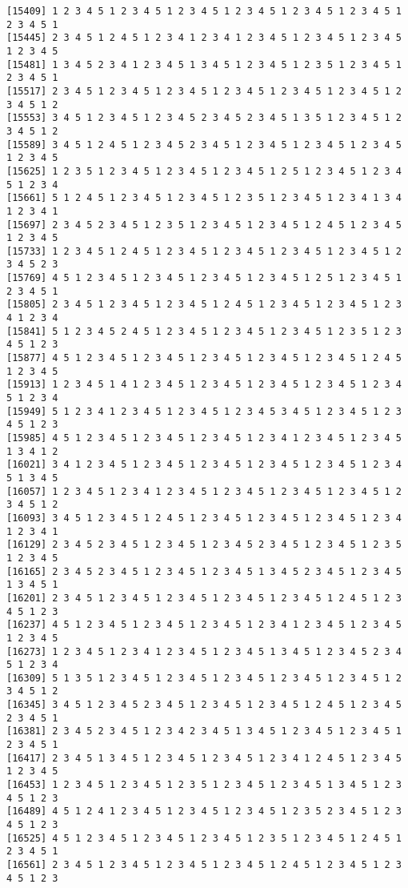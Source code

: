 \documentclass[
  11pt,
]{book}
\begin{document}
\begin{verbatim}
[15409] 1 2 3 4 5 1 2 3 4 5 1 2 3 4 5 1 2 3 4 5 1 2 3 4 5 1 2 3 4 5 1 2 3 4 5 1
[15445] 2 3 4 5 1 2 4 5 1 2 3 4 1 2 3 4 1 2 3 4 5 1 2 3 4 5 1 2 3 4 5 1 2 3 4 5
[15481] 1 3 4 5 2 3 4 1 2 3 4 5 1 3 4 5 1 2 3 4 5 1 2 3 5 1 2 3 4 5 1 2 3 4 5 1
[15517] 2 3 4 5 1 2 3 4 5 1 2 3 4 5 1 2 3 4 5 1 2 3 4 5 1 2 3 4 5 1 2 3 4 5 1 2
[15553] 3 4 5 1 2 3 4 5 1 2 3 4 5 2 3 4 5 2 3 4 5 1 3 5 1 2 3 4 5 1 2 3 4 5 1 2
[15589] 3 4 5 1 2 4 5 1 2 3 4 5 2 3 4 5 1 2 3 4 5 1 2 3 4 5 1 2 3 4 5 1 2 3 4 5
[15625] 1 2 3 5 1 2 3 4 5 1 2 3 4 5 1 2 3 4 5 1 2 5 1 2 3 4 5 1 2 3 4 5 1 2 3 4
[15661] 5 1 2 4 5 1 2 3 4 5 1 2 3 4 5 1 2 3 5 1 2 3 4 5 1 2 3 4 1 3 4 1 2 3 4 1
[15697] 2 3 4 5 2 3 4 5 1 2 3 5 1 2 3 4 5 1 2 3 4 5 1 2 4 5 1 2 3 4 5 1 2 3 4 5
[15733] 1 2 3 4 5 1 2 4 5 1 2 3 4 5 1 2 3 4 5 1 2 3 4 5 1 2 3 4 5 1 2 3 4 5 2 3
[15769] 4 5 1 2 3 4 5 1 2 3 4 5 1 2 3 4 5 1 2 3 4 5 1 2 5 1 2 3 4 5 1 2 3 4 5 1
[15805] 2 3 4 5 1 2 3 4 5 1 2 3 4 5 1 2 4 5 1 2 3 4 5 1 2 3 4 5 1 2 3 4 1 2 3 4
[15841] 5 1 2 3 4 5 2 4 5 1 2 3 4 5 1 2 3 4 5 1 2 3 4 5 1 2 3 5 1 2 3 4 5 1 2 3
[15877] 4 5 1 2 3 4 5 1 2 3 4 5 1 2 3 4 5 1 2 3 4 5 1 2 3 4 5 1 2 4 5 1 2 3 4 5
[15913] 1 2 3 4 5 1 4 1 2 3 4 5 1 2 3 4 5 1 2 3 4 5 1 2 3 4 5 1 2 3 4 5 1 2 3 4
[15949] 5 1 2 3 4 1 2 3 4 5 1 2 3 4 5 1 2 3 4 5 3 4 5 1 2 3 4 5 1 2 3 4 5 1 2 3
[15985] 4 5 1 2 3 4 5 1 2 3 4 5 1 2 3 4 5 1 2 3 4 1 2 3 4 5 1 2 3 4 5 1 3 4 1 2
[16021] 3 4 1 2 3 4 5 1 2 3 4 5 1 2 3 4 5 1 2 3 4 5 1 2 3 4 5 1 2 3 4 5 1 3 4 5
[16057] 1 2 3 4 5 1 2 3 4 1 2 3 4 5 1 2 3 4 5 1 2 3 4 5 1 2 3 4 5 1 2 3 4 5 1 2
[16093] 3 4 5 1 2 3 4 5 1 2 4 5 1 2 3 4 5 1 2 3 4 5 1 2 3 4 5 1 2 3 4 1 2 3 4 1
[16129] 2 3 4 5 2 3 4 5 1 2 3 4 5 1 2 3 4 5 2 3 4 5 1 2 3 4 5 1 2 3 5 1 2 3 4 5
[16165] 2 3 4 5 2 3 4 5 1 2 3 4 5 1 2 3 4 5 1 3 4 5 2 3 4 5 1 2 3 4 5 1 3 4 5 1
[16201] 2 3 4 5 1 2 3 4 5 1 2 3 4 5 1 2 3 4 5 1 2 3 4 5 1 2 4 5 1 2 3 4 5 1 2 3
[16237] 4 5 1 2 3 4 5 1 2 3 4 5 1 2 3 4 5 1 2 3 4 1 2 3 4 5 1 2 3 4 5 1 2 3 4 5
[16273] 1 2 3 4 5 1 2 3 4 1 2 3 4 5 1 2 3 4 5 1 3 4 5 1 2 3 4 5 2 3 4 5 1 2 3 4
[16309] 5 1 3 5 1 2 3 4 5 1 2 3 4 5 1 2 3 4 5 1 2 3 4 5 1 2 3 4 5 1 2 3 4 5 1 2
[16345] 3 4 5 1 2 3 4 5 2 3 4 5 1 2 3 4 5 1 2 3 4 5 1 2 4 5 1 2 3 4 5 2 3 4 5 1
[16381] 2 3 4 5 2 3 4 5 1 2 3 4 2 3 4 5 1 3 4 5 1 2 3 4 5 1 2 3 4 5 1 2 3 4 5 1
[16417] 2 3 4 5 1 3 4 5 1 2 3 4 5 1 2 3 4 5 1 2 3 4 1 2 4 5 1 2 3 4 5 1 2 3 4 5
[16453] 1 2 3 4 5 1 2 3 4 5 1 2 3 5 1 2 3 4 5 1 2 3 4 5 1 3 4 5 1 2 3 4 5 1 2 3
[16489] 4 5 1 2 4 1 2 3 4 5 1 2 3 4 5 1 2 3 4 5 1 2 3 5 2 3 4 5 1 2 3 4 5 1 2 3
[16525] 4 5 1 2 3 4 5 1 2 3 4 5 1 2 3 4 5 1 2 3 5 1 2 3 4 5 1 2 4 5 1 2 3 4 5 1
[16561] 2 3 4 5 1 2 3 4 5 1 2 3 4 5 1 2 3 4 5 1 2 4 5 1 2 3 4 5 1 2 3 4 5 1 2 3

\end{verbatim}
\end{document}
